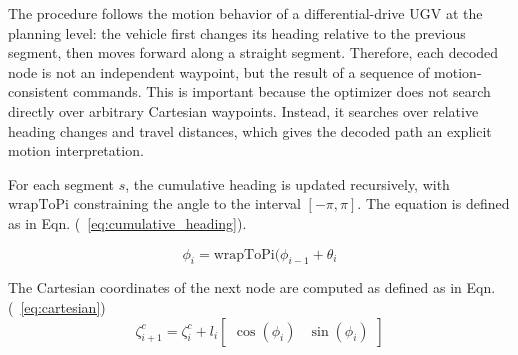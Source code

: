 \documentclass[8pt]{article}
\begin{document}
\begin{algorithm}[h]
\caption{Path Transformation from Motion Space to Task Space}
\label{alg:path_transform}
\BlankLine
{}
\end{algorithm}

The procedure follows the motion behavior of a differential-drive UGV at the planning level: the vehicle first changes its heading relative to the previous segment, then moves forward along a straight segment. Therefore, each decoded node is not an independent waypoint, but the result of a sequence of motion-consistent commands. This is important because the optimizer does not search directly over arbitrary Cartesian waypoints. Instead, it searches over relative heading changes and travel distances, which gives the decoded path an explicit motion interpretation.

For each segment $s$, the cumulative heading is updated recursively, with $\mathrm{wrapToPi}$ constraining the angle to the interval $[-\pi,\pi]$. The equation is defined as in Eqn. (~\ref{eq:cumulative_heading}).

\begin{equation}
\label{eq:cumulative_heading}
    \phi_i=\mathrm{wrapToPi}(\phi_{i-1}+\theta_i
\end{equation}

The Cartesian coordinates of the next node are computed as defined as in Eqn. (~\ref{eq:cartesian})
\begin{equation}
\label{eq:cartesian}
    \zeta^c_{i+1} = \zeta^c_i + l_i \begin{bmatrix} \cos(\phi_i) & \sin(\phi_i) \end{bmatrix}
\end{equation}
\end{document}
